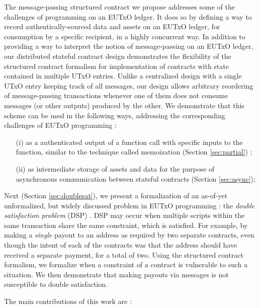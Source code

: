 The message-passing structured contract we propose addresses
some of the challenges of programming on an EUTxO ledger. It does so by
defining a way to record authentically-sourced data and assets on an EUTxO ledger,
for consumption by a specific recipient, in a highly concurrent way.
In addition to providing a way to interpret the notion of message-passing
on an EUTxO ledger, our distributed stateful contract design demonstrates
the flexibility of the structured contract formalism for implementation
of contracts with state contained in multiple UTxO entries. Unlike a centralized
design with a single UTxO entry keeping track of all messages, our design allows
arbitrary reordering of message-passing transactions whenever one of them does not
consume messages (or other outputs) produced by the other.
We demonstrate that this scheme can be used in the following ways, addressing the
corresponding challenges of EUTxO programming :

\begin{itemize}
  \item[(i)] as a authenticated output of a function call with specific
  inputs to the function, similar to the technique called memoization (Section \ref{sec:partial}) ;

  \item[(ii)] as intermediate storage of assets and data for the purpose
  of asynchronous communication between stateful contracts
   (Section \ref{sec:async});
\end{itemize}

Next (Section \ref{sec:doublesat}), we present a formalization of an as-of-yet unformalized, but widely discussed
problem in EUTxO programming :
the \emph{double satisfaction problem} (DSP) \cite{marlowe-audit-tech} \cite{plutus-docs} \cite{ds-blog}
\cite{marloweaudit}. DSP may occur when multiple scripts within
the same transaction share the same constraint, which is satisfied. For example,
by making a \emph{single} payout to an address as required
by two separate contracts, even though the intent of each of the contracts was that
the address should have received a separate payment, for a total of two.
Using the structured contract formalism, we formalize when a constraint
of a contract is vulnerable to such a situation. We then demonstrate that making
payouts via messages is not susceptible to double satisfaction.

The main contributions of this work are :

